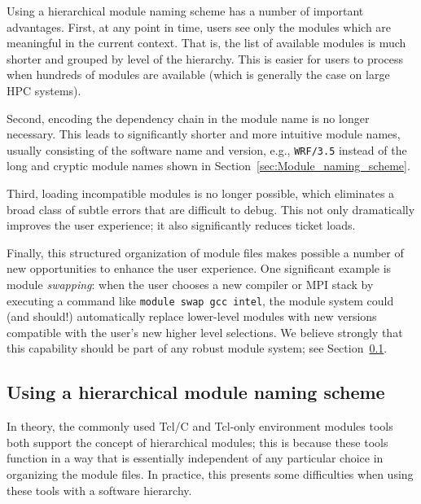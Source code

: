 
Using a hierarchical module naming scheme has a number of important
advantages. First, at any point in time, users see only the
modules which are meaningful in the current context. That is, the list of
available modules is much shorter and grouped by level of the hierarchy. This is easier for users to process when hundreds of modules are
available (which is generally the case on large HPC systems).

Second, encoding the dependency chain in the module name is no longer
necessary. This leads to significantly shorter and more intuitive
module names, usually consisting of the software name and version, e.g.,
\texttt{\small WRF/3.5} instead of the long and cryptic module names shown in
Section~\ref{sec:Module_naming_scheme}.

Third, loading incompatible
modules is no longer possible, which eliminates a broad class of subtle errors that are difficult to
debug. This not only dramatically improves the user experience; it
also significantly reduces ticket loads.

Finally, this structured organization of module files makes possible
a number of new opportunities to enhance the user experience. One significant example is module \emph{swapping}: when the user chooses a new compiler or MPI stack by executing a command like \texttt{\small module swap gcc intel}, the module system could (and should!) automatically replace lower-level modules with new versions compatible with the user's new higher level selections. We believe strongly that this capability should be part of any robust module system; see Section~\ref{sec:using_a_hierarchy}.


\subsection{Using a hierarchical module naming scheme}
\label{sec:using_a_hierarchy}

In theory, the commonly used Tcl/C and Tcl-only environment modules tools
both support the concept of hierarchical modules; this is because these tools function in a way that is essentially independent of any particular choice in organizing the module files. In practice, this presents some difficulties when using these tools with a software hierarchy.

